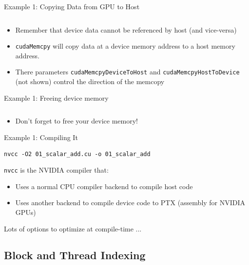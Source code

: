 \documentclass{beamer}
\begin{document}
    \begin{frame}{Example 1: Copying Data from GPU to Host}
        \begin{block}{}
            \inputminted[firstline=13,lastline=13]{cuda}{src/01_scalar_add.cu}
        \end{block}
        \begin{itemize}
            \item Remember that device data cannot be referenced by host (and vice-versa)
            \item \texttt{cudaMemcpy} will copy data at a device memory address to a host memory address.
            \item There parameters \texttt{cudaMemcpyDeviceToHost} and \texttt{cudaMemcpyHostToDevice} (not shown) control the direction of the memcopy
        \end{itemize}
    \end{frame}

    \begin{frame}{Example 1:  Freeing device memory}
        \begin{block}{}
            \inputminted[firstline=17,lastline=17]{cuda}{src/01_scalar_add.cu}
        \end{block}
        \begin{itemize}
            \item Don't forget to free your device memory!
        \end{itemize}
    \end{frame}

    \begin{frame}{Example 1: Compiling It}
        \begin{block}{}
\texttt{nvcc -O2 01\_scalar\_add.cu -o 01\_scalar\_add}
        \end{block}
        \texttt{nvcc} is the NVIDIA compiler that:
        \begin{itemize}
            \item Uses a normal CPU compiler backend to compile host code
            \item Uses another backend to compile device code to PTX (assembly for NVIDIA GPUs)
        \end{itemize}
        Lots of options to optimize at compile-time ...
    \end{frame}

    \subsection{Block and Thread Indexing}
\end{document}

